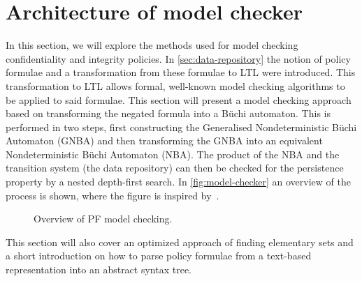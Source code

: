 \section{Architecture of model checker}\label{sec:methods}
In this section, we will explore the methods used for model checking confidentiality and integrity policies. In \autoref{sec:data-repository} the notion of policy formulae and a transformation from these formulae to LTL were introduced. This transformation to LTL allows formal, well-known model checking algorithms to be applied to said formulae. This section will present a model checking approach based on transforming the negated formula into a Büchi automaton. This is performed in two steps, first constructing the Generalised Nondeterministic Büchi Automaton (GNBA) and then transforming the GNBA into an equivalent Nondeterministic Büchi Automaton (NBA). The product of the NBA and the transition system (the data repository) can then be checked for the persistence property by a nested depth-first search. In \autoref{fig:model-checker} an overview of the process is shown, where the figure is inspired by~\cite[Fig.~5.16]{baier2008principles}.

\begin{figure}[!ht]
    \centering
    
    \caption{Overview of PF model checking.}
    \label{fig:model-checker}
\end{figure}

This section will also cover an optimized approach of finding elementary sets and a short introduction on how to parse policy formulae from a text-based representation into an abstract syntax tree.

